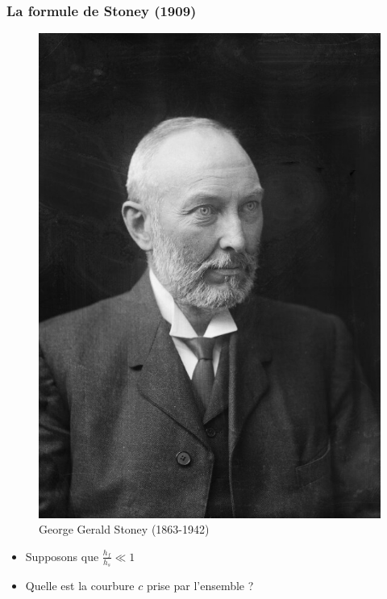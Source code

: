 \begin{frame}
    \frametitle{La formule de Stoney (1909)}
    
    \begin{figure}
        \centering
        \includegraphics[scale=0.07]{imgs/stoney.jpg}
        \caption{George Gerald Stoney (1863-1942)}
    \end{figure}

    \begin{itemize}
        \item Supposons que $\frac{h_f}{h_s} \ll 1$
        \item Quelle est la courbure $c$ prise par l'ensemble ?
    \end{itemize}
    

\end{frame}
